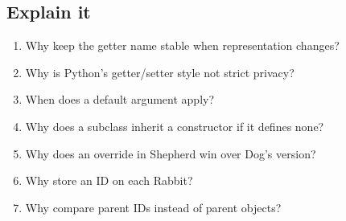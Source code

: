\documentclass[11pt]{article}
\begin{document}
\begin{keepsection}
\section{Explain it}

\begin{enumerate}
\item Why keep the getter name stable when representation changes?
\item Why is Python’s getter/setter style not strict privacy?
\item When does a default argument apply?
\item Why does a subclass inherit a constructor if it defines none?
\item Why does an override in Shepherd win over Dog’s version?
\item Why store an ID on each Rabbit?
\item Why compare parent IDs instead of parent objects?
\end{enumerate}

\end{keepsection}

\clearpage
\end{document}

